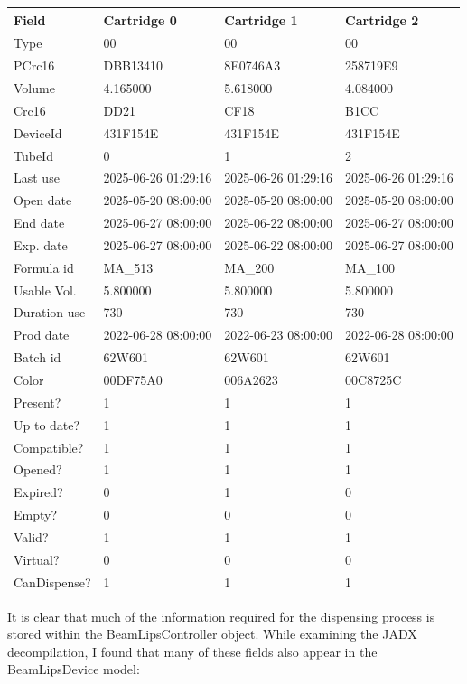 \begin{tabular}{|l|l|l|l|}
	\hline
	\textbf{Field} & \textbf{Cartridge 0} & \textbf{Cartridge 1} & \textbf{Cartridge 2} \\ \hline
	Type & 00 & 00 & 00 \\ \hline
	PCrc16 & DBB13410 & 8E0746A3 & 258719E9 \\ \hline
	Volume & 4.165000 & 5.618000 & 4.084000 \\ \hline
	Crc16 & DD21 & CF18 & B1CC \\ \hline
	DeviceId & 431F154E & 431F154E & 431F154E \\ \hline
	TubeId & 0 & 1 & 2 \\ \hline
	Last use & 2025-06-26 01:29:16 & 2025-06-26 01:29:16 & 2025-06-26 01:29:16 \\ \hline
	Open date & 2025-05-20 08:00:00 & 2025-05-20 08:00:00 & 2025-05-20 08:00:00 \\ \hline
	End date & 2025-06-27 08:00:00 & 2025-06-22 08:00:00 & 2025-06-27 08:00:00 \\ \hline
	Exp. date & 2025-06-27 08:00:00 & 2025-06-22 08:00:00 & 2025-06-27 08:00:00 \\ \hline
	Formula id & MA\_513 & MA\_200 & MA\_100 \\ \hline
	Usable Vol. & 5.800000 & 5.800000 & 5.800000 \\ \hline
	Duration use & 730 & 730 & 730 \\ \hline
	Prod date & 2022-06-28 08:00:00 & 2022-06-23 08:00:00 & 2022-06-28 08:00:00 \\ \hline
	Batch id & 62W601 & 62W601 & 62W601 \\ \hline
	Color & 00DF75A0 & 006A2623 & 00C8725C \\ \hline
	Present? & 1 & 1 & 1 \\ \hline
	Up to date? & 1 & 1 & 1 \\ \hline
	Compatible? & 1 & 1 & 1 \\ \hline
	Opened? & 1 & 1 & 1 \\ \hline
	Expired? & 0 & 1 & 0 \\ \hline
	Empty? & 0 & 0 & 0 \\ \hline
	Valid? & 1 & 1 & 1 \\ \hline
	Virtual? & 0 & 0 & 0 \\ \hline
	CanDispense? & 1 & 1 & 1 \\ \hline
\end{tabular}

It is clear that much of the information required for the dispensing process is stored within the BeamLipsController object. While examining the JADX decompilation, I found that many of these fields also appear in the BeamLipsDevice model:

